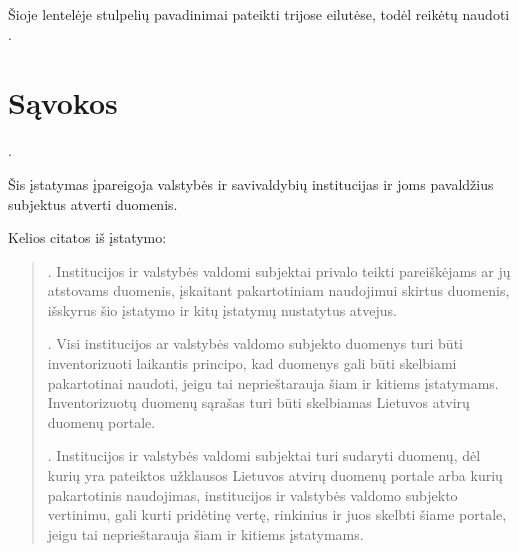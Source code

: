 \documentclass[letterpaper,10pt,lithuanian]{sphinxmanual}
\begin{document}
\sphinxAtStartPar
Šioje lentelėje stulpelių pavadinimai pateikti trijose eilutėse, todėl
 reikėtų naudoti {\hyperref[\detokenize{formules:func.header}]{}}.

\sphinxstepscope


\section{Sąvokos}
\label{\detokenize{savokos:savokos}}\label{\detokenize{savokos::doc}}\begin{description}
\sphinxAtStartPar
{}.

\sphinxAtStartPar
Šis įstatymas įpareigoja valstybės ir savivaldybių institucijas ir
joms pavaldžius subjektus atverti duomenis.

\sphinxAtStartPar
Kelios citatos iš įstatymo:
\begin{quote}

\sphinxAtStartPar
{}

. Institucijos ir valstybės valdomi subjektai privalo teikti
pareiškėjams ar jų atstovams duomenis, įskaitant pakartotiniam
naudojimui skirtus duomenis, išskyrus šio įstatymo ir kitų įstatymų
nustatytus atvejus.

\sphinxAtStartPar
{}

. Visi institucijos ar valstybės valdomo subjekto duomenys turi
būti inventorizuoti laikantis principo, kad duomenys gali būti
skelbiami pakartotinai naudoti, jeigu tai neprieštarauja šiam ir
kitiems įstatymams. Inventorizuotų duomenų sąrašas turi būti
skelbiamas Lietuvos atvirų duomenų portale.

. Institucijos ir valstybės valdomi subjektai turi sudaryti
duomenų, dėl kurių yra pateiktos užklausos Lietuvos atvirų duomenų
portale arba kurių pakartotinis naudojimas, institucijos ir
valstybės valdomo subjekto vertinimu, gali kurti pridėtinę vertę,
rinkinius ir juos skelbti šiame portale, jeigu tai neprieštarauja
šiam ir kitiems įstatymams.

\sphinxAtStartPar
{}


\end{quote}
\end{description}
\end{document}
